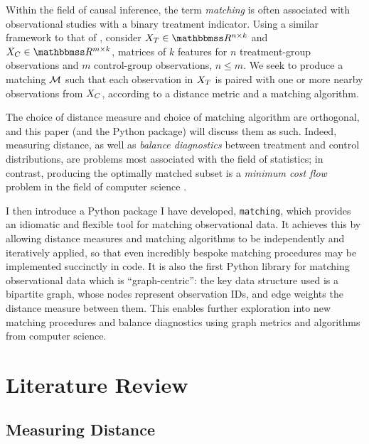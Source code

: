 \documentclass[11pt]{extarticle}
\begin{document}
Within the field of causal inference, the term \emph{matching} is often associated with observational studies with a binary treatment indicator.
Using a similar framework to that of \textcite{iacus_multivariate_2011}, consider $\mat{X}_T \in \reals^{n \times k}$ and $\mat{X}_C \in \reals^{m \times k}$, matrices of $k$ features for $n$ treatment-group observations and $m$ control-group observations, $n \leq m$.
We seek to produce a matching $\mathcal{M}$ such that each observation in $X_T$ is paired with one or more nearby observations from $X_C$, according to a distance metric and a matching algorithm.

The choice of distance measure and choice of matching algorithm are orthogonal, and this paper (and the Python package) will discuss them as such. Indeed, measuring distance, as well as \emph{balance diagnostics} between treatment and control distributions, are problems most associated with the field of statistics; in contrast, producing the optimally matched subset is a \emph{minimum cost flow} problem in the field of computer science \parencite{rosenbaum_optimal_1989}.

I then introduce a Python package I have developed, \texttt{matching}, which provides an idiomatic and flexible tool for matching observational data. It achieves this by allowing distance measures and matching algorithms to be independently and iteratively applied, so that even incredibly bespoke matching procedures may be implemented succinctly in code. It is also the first Python library for matching observational data which is ``graph-centric'': the key data structure used is a bipartite graph, whose nodes represent observation IDs, and edge weights the distance measure between them. This enables further exploration into new matching procedures and balance diagnostics using graph metrics and algorithms from computer science.




\section{Literature Review}
\label{sec:litrev}


\subsection{Measuring Distance}
\end{document}
